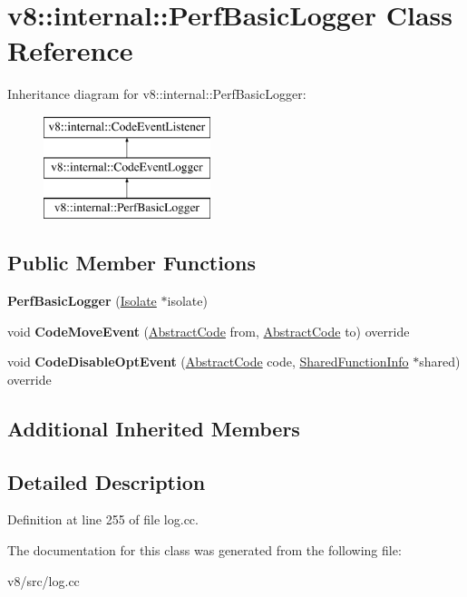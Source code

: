 \hypertarget{classv8_1_1internal_1_1PerfBasicLogger}{}\section{v8\+:\+:internal\+:\+:Perf\+Basic\+Logger Class Reference}
\label{classv8_1_1internal_1_1PerfBasicLogger}
Inheritance diagram for v8\+:\+:internal\+:\+:Perf\+Basic\+Logger\+:\begin{figure}[H]
\begin{center}
\leavevmode
\includegraphics[height=3.000000cm]{classv8_1_1internal_1_1PerfBasicLogger}
\end{center}
\end{figure}
\subsection*{Public Member Functions}
\begin{DoxyCompactItemize}
\item 
\mbox{\label{classv8_1_1internal_1_1PerfBasicLogger_a5d7971c46f0383a88890c42bf7724e88}} 
{\bfseries Perf\+Basic\+Logger} (\mbox{\hyperlink{classv8_1_1internal_1_1Isolate}{Isolate}} $\ast$isolate)
\item 
\mbox{\label{classv8_1_1internal_1_1PerfBasicLogger_a087ae4c3c6816193c8ff13f27f18192f}} 
void {\bfseries Code\+Move\+Event} (\mbox{\hyperlink{classv8_1_1internal_1_1AbstractCode}{Abstract\+Code}} from, \mbox{\hyperlink{classv8_1_1internal_1_1AbstractCode}{Abstract\+Code}} to) override
\item 
\mbox{\label{classv8_1_1internal_1_1PerfBasicLogger_a09ad8f853a3a90a9fed2574ebc0954b8}} 
void {\bfseries Code\+Disable\+Opt\+Event} (\mbox{\hyperlink{classv8_1_1internal_1_1AbstractCode}{Abstract\+Code}} code, \mbox{\hyperlink{classv8_1_1internal_1_1SharedFunctionInfo}{Shared\+Function\+Info}} $\ast$shared) override
\end{DoxyCompactItemize}
\subsection*{Additional Inherited Members}


\subsection{Detailed Description}


Definition at line 255 of file log.\+cc.



The documentation for this class was generated from the following file\+:\begin{DoxyCompactItemize}
\item 
v8/src/log.\+cc\end{DoxyCompactItemize}
